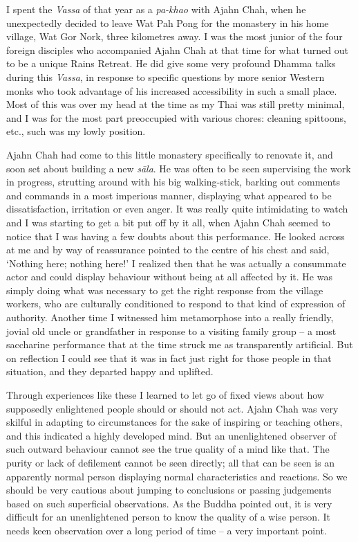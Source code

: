 I spent the \emph{Vassa} of that year as a \emph{pa-khao} with Ajahn
Chah, when he unexpectedly decided to leave Wat Pah Pong for the
monastery in his home village, Wat Gor Nork, three kilometres away. I
was the most junior of the four foreign disciples who accompanied Ajahn
Chah at that time for what turned out to be a unique Rains Retreat. He
did give some very profound Dhamma talks during this \emph{Vassa}, in
response to specific questions by more senior Western monks who took
advantage of his increased accessibility in such a small place. Most of
this was over my head at the time as my Thai was still pretty minimal, 
and I was for the most part preoccupied with various chores: cleaning
spittoons, etc., such was my lowly position.

Ajahn Chah had come to this little monastery specifically to renovate
it, and soon set about building a new \emph{sāla}. He was often to be
seen supervising the work in progress, strutting around with his big
walking-stick, barking out comments and commands in a most imperious
manner, displaying what appeared to be dissatisfaction, irritation or
even anger. It was really quite intimidating to watch and I was starting
to get a bit put off by it all, when Ajahn Chah seemed to notice that I
was having a few doubts about this performance. He looked across at me
and by way of reassurance pointed to the centre of his chest and said, 
`Nothing here; nothing here!' I realized then that he was actually a
consummate actor and could display behaviour without being at all
affected by it. He was simply doing what was necessary to get the right
response from the village workers, who are culturally conditioned to
respond to that kind of expression of authority. Another time I
witnessed him metamorphose into a really friendly, jovial old uncle or
grandfather in response to a visiting family group -- a most saccharine
performance that at the time struck me as transparently artificial. But
on reflection I could see that it was in fact just right for those
people in that situation, and they departed happy and uplifted.

Through experiences like these I learned to let go of fixed views about
how supposedly enlightened people should or should not act. Ajahn Chah
was very skilful in adapting to circumstances for the sake of inspiring
or teaching others, and this indicated a highly developed mind. But an
unenlightened observer of such outward behaviour cannot see the true
quality of a mind like that. The purity or lack of defilement cannot be
seen directly; all that can be seen is an apparently normal person
displaying normal characteristics and reactions. So we should be very
cautious about jumping to conclusions or passing judgements based on
such superficial observations. As the Buddha pointed out, it is very
difficult for an unenlightened person to know the quality of a wise
person. It needs keen observation over a long period of time -- a very
important point.

